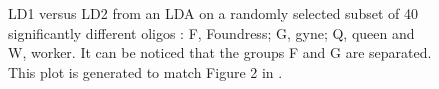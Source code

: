\begin{figure}[hbtp]
   \centering
       \caption{LD1 versus LD2 from an LDA on a randomly selected subset of 40 significantly different oligos : F, Foundress; G, gyne; Q, queen and W, worker. It can be noticed that the groups F and G are separated. This plot is generated to match Figure 2 in \cite{toth:2010}. }
     \label{oligo}
\end{figure}  



